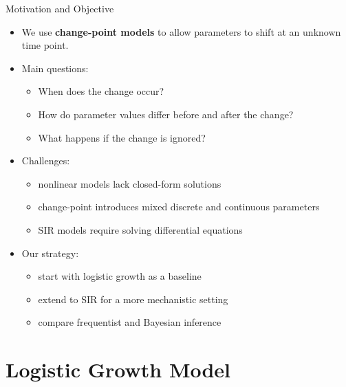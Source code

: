 \documentclass[
  ignorenonframetext,
  aspectratio=169,
]{beamer}
\providecommand{\tightlist}{%
  \setlength{\itemsep}{0pt}\setlength{\parskip}{0pt}}\usepackage{longtable,booktabs,array}
\begin{document}
\begin{frame}{Motivation and Objective}
\label{motivation-and-objective}
\begin{itemize}
\tightlist
\item
  We use \textbf{change-point models} to allow parameters to shift at an
  unknown time point.
\item
  Main questions:

  \begin{itemize}
  \tightlist
  \item
    When does the change occur?
  \item
    How do parameter values differ before and after the change?
  \item
    What happens if the change is ignored?
  \end{itemize}
\item
  Challenges:

  \begin{itemize}
  \tightlist
  \item
    nonlinear models lack closed-form solutions
  \item
    change-point introduces mixed discrete and continuous parameters
  \item
    SIR models require solving differential equations
  \end{itemize}
\item
  Our strategy:

  \begin{itemize}
  \tightlist
  \item
    start with logistic growth as a baseline
  \item
    extend to SIR for a more mechanistic setting
  \item
    compare frequentist and Bayesian inference
  \end{itemize}
\end{itemize}
\end{frame}

\section{Logistic Growth Model}\label{logistic-growth-model}
\end{document}
